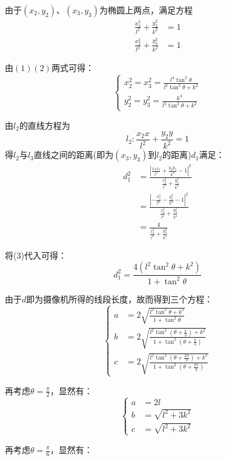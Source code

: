 \documentclass[a4paper,10.5pt]{ctexart}
\begin{document}
\par 由于$(x_2,y_2)$、$(x_3,y_3)$为椭圆上两点，满足方程
\begin{equation}
\begin{align*}
\frac{x_2^2}{l^2}+\frac{y_2^2}{k^2}&=1 \\
 \frac{x_3^2}{l^2}+\frac{y_3^2}{k^2}&=1
\end{align*}
\end{equation}
\par 由$(1)(2)$两式可得：
\begin{equation}
\left\{
\begin{aligned}
x_2^2=x_3^2=\frac{l^4\tan^2\theta}{l^2\tan^2\theta+k^2} \\
y_2^2=y_3^2=\frac{k^4}{l^2\tan^2\theta+k^2}
\end{aligned}
\right.
\end{equation}
\par 由$l_2$的直线方程为$$l_2:\frac{x_2x}{l^2}+\frac{y_2y}{k^2}=1$$
得$l_2$与$l_3$直线之间的距离(即为$(x_3,y_3)$到$l_2$的距离)$d_1$满足：
\begin{align*}
d_1^2&= \frac{|\frac{x_2x_3}{l^2}+\frac{y_2y_3}{k^2}-1|^2}{\frac{x_2^2}{l^4}+\frac{y_2^2}{k^4}}\\
 &=\frac{|-\frac{x_2^2}{l^2}-\frac{y_2^2}{k^2}-1|^2}{\frac{x_2^2}{l^4}+\frac{y_2^2}{k^4}}\\
 &=\frac{4}{\frac{x_2^2}{l^4}+\frac{y_2^2}{k^4}}
\end{align*}
\par 将(3)代入可得：
$$d_1^2=\frac{4(l^2\tan^2\theta+k^2)}{1+\tan^2\theta}$$
\par 由于$d$即为摄像机所得的线段长度，故而得到三个方程：
\begin{equation}
\left\{
\begin{aligned}
a&=2\sqrt{\frac{l^2\tan^2\theta+k^2}{1+\tan^2\theta}}\\
b&=2\sqrt{\frac{l^2\tan^2(\theta+\frac{\pi}{3})+k^2}{1+\tan^2(\theta+\frac{\pi}{3})}}\\
c&=2\sqrt{\frac{l^2\tan^2(\theta+\frac{2\pi}{3})+k^2}{1+\tan^2(\theta+\frac{2\pi}{3})}}

\end{aligned}
\right.
\end{equation}
\par 再考虑$\theta=\frac{\pi}{2}$，显然有：
\begin{equation}
\left\{
\begin{aligned}
a&=2l\\
b&=\sqrt{l^2+3k^2}\\
c&=\sqrt{l^2+3k^2}
\end{aligned}
\right.
\end{equation}
\par 再考虑$\theta=\frac{\pi}{6}$，显然有：
\end{document}
